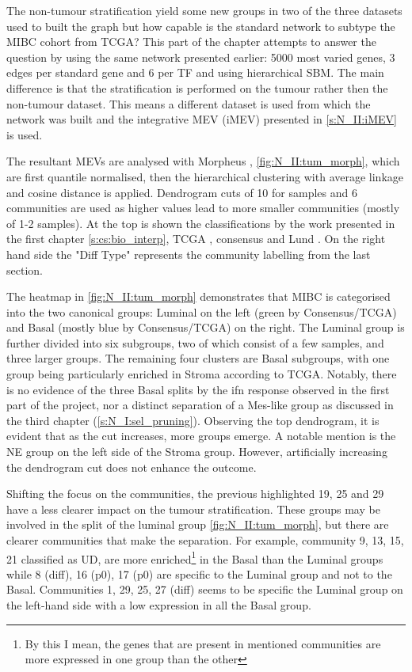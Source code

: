 The non-tumour stratification yield some new groups in two of the three datasets used to built the graph but how capable is the standard network to subtype the MIBC cohort from TCGA? This part of the chapter attempts to answer the question by using the same network presented earlier: 5000 most varied genes, 3 edges per standard gene and 6 per TF and using hierarchical SBM. The main difference is that the stratification is performed on the tumour rather then the non-tumour dataset. This means a different dataset is used from which the network was built and the integrative MEV (iMEV) presented in \cref{s:N_II:iMEV} is used.

The resultant MEVs are analysed with Morpheus \citet{broad}, \cref{fig:N_II:tum_morph}, which are first quantile normalised, then the hierarchical clustering with average linkage and cosine distance is applied. Dendrogram cuts of 10 for samples and 6 communities are used as higher values lead to more smaller communities (mostly of 1-2 samples). At the top is shown the classifications by the work presented in the first chapter \cref{s:cs:bio_interp}, TCGA \citet{Robertson2017-mg}, consensus\citet{Kamoun2020-tj} and Lund \citet{Marzouka2018-ge}. On the right hand side the "Diff Type" represents the community labelling from the last section.

The heatmap in \cref{fig:N_II:tum_morph} demonstrates that MIBC is categorised into the two canonical groups: Luminal on the left (green by Consensus/TCGA) and Basal (mostly blue by Consensus/TCGA) on the right. The Luminal group is further divided into six subgroups, two of which consist of a few samples, and three larger groups. The remaining four clusters are Basal subgroups, with one group being particularly enriched in Stroma according to TCGA. Notably, there is no evidence of the three Basal splits by the \acrfull{ifn} response observed in the first part of the project, nor a distinct separation of a Mes-like group as discussed in the third chapter (\cref{s:N_I:sel_pruning}). Observing the top dendrogram, it is evident that as the cut increases, more groups emerge. A notable mention is the NE group on the left side of the Stroma group. However, artificially increasing the dendrogram cut does not enhance the outcome.

Shifting the focus on the communities, the previous highlighted 19, 25 and 29 have a less clearer impact on the tumour stratification. These groups may be involved in the split of the luminal group \cref{fig:N_II:tum_morph}, but there are clearer communities that make the separation. For example, community 9, 13, 15, 21 classified as UD, are more enriched\footnote{By this I mean, the genes that are present in mentioned communities are more expressed in one group than the other} in the Basal than the Luminal groups while 8 (diff), 16 (p0), 17 (p0) are specific to the Luminal group and not to the Basal. Communities 1, 29, 25, 27 (diff) seems to be specific the Luminal group on the left-hand side with a low expression in all the Basal group. 

